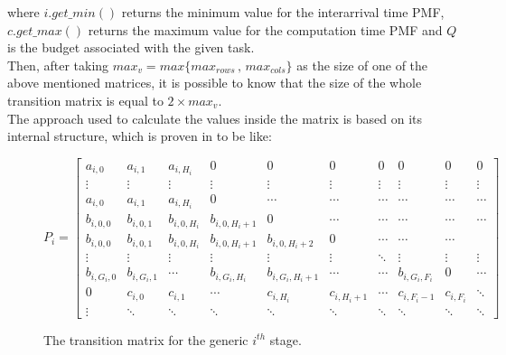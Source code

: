 where \( i.get\_min() \) returns the minimum value for the interarrival time PMF, \( c.get\_max() \) returns the maximum value for the computation time PMF and \( Q \) is the budget associated with the given task.\\
Then, after taking \( max_{v} = max\{max_{rows}\,,\,max_{cols}\} \) as the size of one of the above mentioned matrices, it is possible to know that the size of the whole transition matrix is equal to \( 2 \times max_{v} \).\\
The approach used to calculate the values inside the matrix is based on its internal structure, which is proven in \cite{pipelines} to be like:
\begin{figure}[H] \label{matrixstructure}
\begin{equation*} 
  P_{i} = 
  \begin{bmatrix}
    a_{i,0} & a_{i,1} & a_{i,H_{i}} & 0 & 0 & 0 & 0 & 0 & 0 & 0 \\
    \vdots & \vdots & \vdots & \vdots & \vdots & \vdots & \vdots & \vdots & \vdots & \vdots\\
    a_{i,0} & a_{i,1} & a_{i,H_{i}} & 0 & \cdots & \cdots & \cdots & \cdots & \cdots & \cdots \\
    b_{i,0,0} & b_{i,0,1} & b_{i,0,H_{i}} & b_{i,0,H_{i}+1} & 0 & \cdots & \cdots & \cdots & \cdots & \cdots \\
    b_{i,0,0} & b_{i,0,1} & b_{i,0,H_{i}} & b_{i,0,H_{i}+1} & b_{i,0,H_{i}+2} & 0 & \cdots & \cdots & \cdots \\
    \vdots & \vdots & \vdots & \vdots & \vdots & \vdots & \ddots & \vdots & \vdots & \vdots \\
    b_{i,G_{i},0} & b_{i,G_{i},1} & \cdots & b_{i,G_{i},H_{i}} & b_{i,G_{i},H_{i}+1} & \cdots & \cdots & b_{i,G_{i},F_{i}} & 0 & \cdots \\
    0 & c_{i,0} & c_{i,1} & \cdots & c_{i,H_{i}} & c_{i,H_{i}+1} & \cdots & c_{i,F_{i}-1} & c_{i,F_{i}} & \ddots \\
    \vdots & \ddots & \ddots & \ddots & \ddots & \ddots & \ddots & \ddots & \ddots & \ddots
  \end{bmatrix}
\end{equation*}
\caption{The transition matrix for the generic \( i^{th} \) stage.}
\end{figure}

